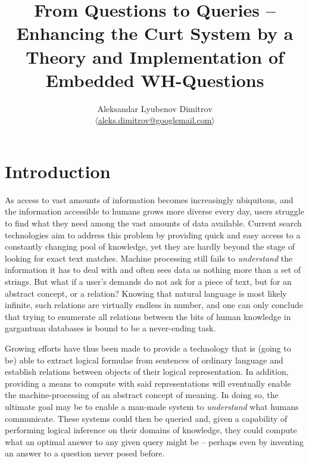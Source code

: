 \documentclass[notitlepage,twoside,a4paper]{scrreprt}
\author{Aleksandar Lyubenov Dimitrov\\
$\langle$\href{mailto:aleks.dimitrov@googlemail.com}{aleks.dimitrov@googlemail.com}$\rangle$}
\title{From Questions to Queries – Enhancing the Curt System by a Theory and Implementation of Embedded WH-Questions}
\theoremstyle{remark}
\theoremstyle{remark}
\theoremstyle{definition}
\theoremstyle{definition}
\begin{document}
\lstset{language=Prolog,numbers=left,numberstyle=\tiny,numbersep=5pt,stepnumber=2,basicstyle=\small\ttfamily,identifierstyle=\textbf,keywordstyle=\underbar}
\renewcommand{\thepage}{\roman{page}}
\tableofcontents
\newpage
{}
\thispagestyle{plain}
\newpage
\renewcommand{\thepage}{\arabic{page}}
\setcounter{page}{1}
\chapter{Introduction}

As access to vast amounts of information becomes increasingly ubiquitous, and
the information accessible to humans grows more diverse every day, users
struggle to find what they need among the vast amounts of data available.
Current search technologies aim to address this problem by providing quick and
easy access to a constantly changing pool of knowledge, yet they are hardly
beyond the stage of looking for exact text matches. Machine processing still
fails to \emph{understand} the information it has to deal with and often sees data as
nothing more than a set of strings. But what if a user's demands do not ask for a
piece of text, but for an abstract concept, or a relation? Knowing that natural
language is most likely infinite, such relations are virtually endless in
number, and  one can only conclude that trying to enumerate all relations
between the bits of  human knowledge in gargantuan databases is bound to be a
never-ending task.

Growing efforts have thus been made to provide a technology that is (going to
be) able to extract logical formulae from sentences of ordinary language and
establish relations between objects of their logical representation. In
addition, providing a means to compute with said representations will eventually
enable the machine-processing of an abstract concept of meaning. In doing so,
the ultimate goal may be to enable a man-made system to \emph{understand} what
humans communicate.  These systems could then be queried and, given a capability
of performing logical inference on their domains of knowledge, they could
compute what an optimal answer to any given query might be -- perhaps even
by inventing an answer to a question never posed before.
\end{document}
